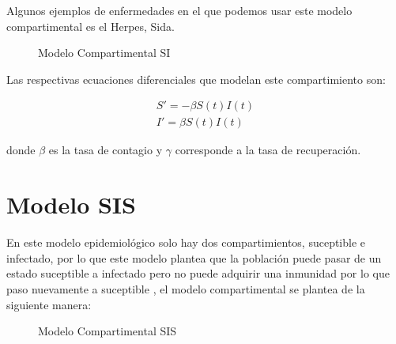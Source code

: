 \documentclass[a4paper,openright,12pt]{book}
\begin{document}
Algunos ejemplos de enfermedades en el que podemos usar este modelo compartimental es el Herpes, Sida.\\

\begin{figure}[h]
\centering
{}
\caption{Modelo Compartimental SI} \label{fig:Compartimento SI}
\end{figure}	

Las respectivas ecuaciones diferenciales que modelan este compartimiento son: 

\begin{align}
S' =  -\beta S\left(t\right)I\left(t\right) \\
I' = \beta S\left(t\right)I\left(t\right)
\end{align}
 
donde  $\beta$ es la tasa de contagio y $\gamma$ corresponde a la tasa de recuperación.\\

\section{Modelo SIS}

En este modelo epidemiológico  solo hay dos compartimientos, suceptible e infectado, por lo que este modelo plantea que la población puede pasar de un estado suceptible a infectado pero no puede adquirir una inmunidad por lo que paso nuevamente a suceptible , el modelo compartimental se plantea de la siguiente manera:\\

\begin{figure}[h]
\centering
{}
\caption{Modelo Compartimental SIS} \label{fig:Compartimento SIS}
\end{figure}	
\end{document}

